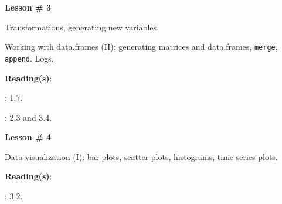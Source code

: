 \documentclass[letterpaper]{article}
\renewenvironment{itemize}{
  \begin{list}{}{
    \setlength{\leftmargin}{1.5em}
  }
}{
  \end{list}
}
\begin{document}
\begin{enumerate}
			\begin{itemize} 
				\item[$\bullet$] {\bf Lesson \# 3} %
					\begin{itemize} 
				\item[$\circ$] Transformations, generating new variables.
				\item[$\circ$] Working with data.frames (II): generating matrices and data.frames, \texttt{merge}, \texttt{append}. Logs.  %
        \item[$\circ$] {\bf Reading(s)}: 
          \begin{itemize}
            \item[$\diamond$] \textcite{Gill:2006wp}: 1.7.
            \item[$\diamond$] \textcite{Fox:2010vc}: 2.3 and 3.4.
          \end{itemize}
					\end{itemize}
			\end{itemize}




			\begin{itemize} 
				\item[$\bullet$] {\bf Lesson \# 4} %
					\begin{itemize} 
						\item[$\circ$] Data visualization (I): bar plots, scatter plots, histograms, time series plots. %
						\item[$\circ$] {\bf Reading(s)}:
							\begin{itemize}
								\item[$\diamond$] \textcite{Fox:2010vc}: 3.2.
							\end{itemize}
					\end{itemize}
			\end{itemize}






\end{enumerate}
\end{document}
